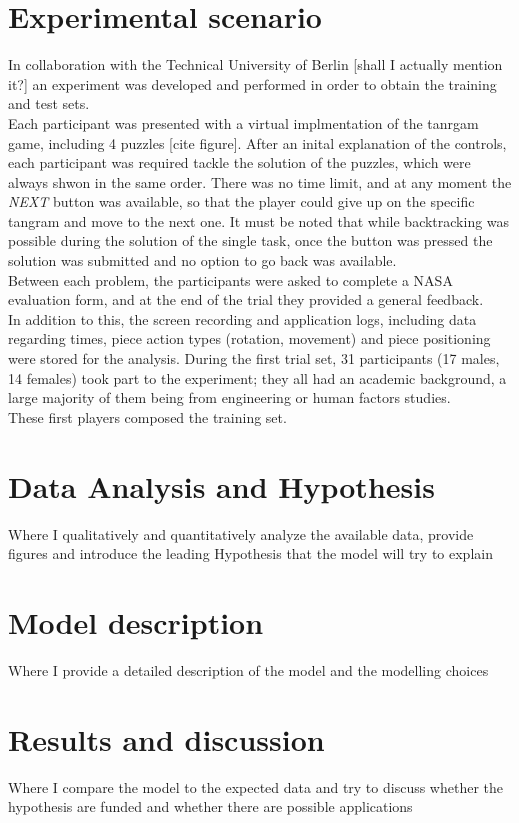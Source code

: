 \documentclass[a4paper,singleside,12pt]{report} %
\begin{document}
	\chapter{Experimental scenario}
    In collaboration with the Technical University of Berlin [shall I actually mention it?] an experiment was developed and performed in order to obtain the training and test sets.\\
	Each participant was presented with a virtual implmentation of the tanrgam game, including 4 puzzles [cite figure]. After an inital explanation of the controls, each participant was required tackle
	the solution of the puzzles, which were always shwon in the same order. There was no time limit, and at any moment the \textit{NEXT} button was available, so that the player could give up on the specific
	tangram and move to the next one. It must be noted that while backtracking was possible during the solution of the single task, once the button was pressed the solution was submitted and no option to go back
	was available.\\
	Between each problem, the participants were asked to complete a NASA evaluation form, and at the end of the trial they provided a general feedback. \\
	In addition to this, the screen recording and application logs, including data regarding times, piece action types (rotation, movement) and piece positioning were stored for the analysis. 
	During the first trial set, 31 participants (17 males, 14 females) took part to the experiment; they all had an academic background, a large majority of them being from engineering or human factors studies. \\
	These first players composed the training set.
    
	
	\chapter{Data Analysis and Hypothesis}
    Where I qualitatively and quantitatively analyze the available data, provide figures and introduce
    the leading Hypothesis that the model will try to explain
    
	
	\chapter{Model description}
    Where I provide a detailed description of the model and the modelling choices
    
	
	\chapter{Results and discussion}
    Where I compare the model to the expected data and try to discuss whether the hypothesis are funded
    and whether there are possible applications
	
	
	\appendix
	
	\printbibliography[heading=bibintoc] %

	
	\acknowledgements
		
		
\end{document}
